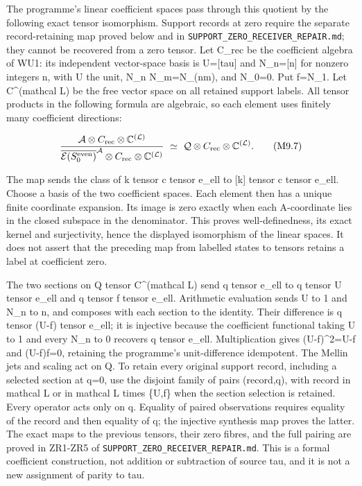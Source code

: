 \documentclass[
]{article}
\begin{document}
The programme's linear coefficient spaces pass through this quotient by
the following exact tensor isomorphism. Support records at zero require
the separate record-retaining map proved below and in
\nolinkurl{SUPPORT_ZERO_RECEIVER_REPAIR.md}; they cannot be recovered from a zero
tensor. Let C\_rec be the coefficient algebra of WU1: its independent
vector-space basis is U={[}tau{]} and N\_n={[}n{]} for nonzero integers
n, with U the unit, N\_n N\_m=N\_(nm), and N\_0=0. Put f=N\_1. Let
C\^{}(mathcal L) be the free vector space on all retained support
labels. All tensor products in the following formula are algebraic, so
each element uses finitely many coefficient directions:

\[
\frac{\mathcal A\otimes C_{\rm rec}\otimes\mathbb C^{(\mathcal L)}}
{\overline{\mathcal E(S_0^{\rm even})}^{\mathcal A}
\otimes C_{\rm rec}\otimes\mathbb C^{(\mathcal L)}}
\ \simeq\
\mathcal Q\otimes C_{\rm rec}\otimes\mathbb C^{(\mathcal L)}.
\tag{M9.7}
\]

The map sends the class of k tensor c tensor e\_ell to {[}k{]} tensor c
tensor e\_ell. Choose a basis of the two coefficient spaces. Each
element then has a unique finite coordinate expansion. Its image is zero
exactly when each A-coordinate lies in the closed subspace in the
denominator. This proves well-definedness, its exact kernel and
surjectivity, hence the displayed isomorphism of the linear spaces. It
does not assert that the preceding map from labelled states to tensors
retains a label at coefficient zero.

The two sections on Q tensor C\^{}(mathcal L) send q tensor e\_ell to q
tensor U tensor e\_ell and q tensor f tensor e\_ell. Arithmetic
evaluation sends U to 1 and N\_n to n, and composes with each section to
the identity. Their difference is q tensor (U-f) tensor e\_ell; it is
injective because the coefficient functional taking U to 1 and every
N\_n to 0 recovers q tensor e\_ell. Multiplication gives (U-f)\^{}2=U-f
and (U-f)f=0, retaining the programme's unit-difference idempotent. The
Mellin jets and scaling act on Q. To retain every original support
record, including a selected section at q=0, use the disjoint family of
pairs (record,q), with record in mathcal L or in mathcal L times \{U,f\}
when the section selection is retained. Every operator acts only on q.
Equality of paired observations requires equality of the record and then
equality of q; the injective synthesis map proves the latter. The exact
maps to the previous tensors, their zero fibres, and the full pairing
are proved in ZR1-ZR5 of \nolinkurl{SUPPORT_ZERO_RECEIVER_REPAIR.md}. This is a
formal coefficient construction, not addition or subtraction of source
tau, and it is not a new assignment of parity to tau.
\end{document}
